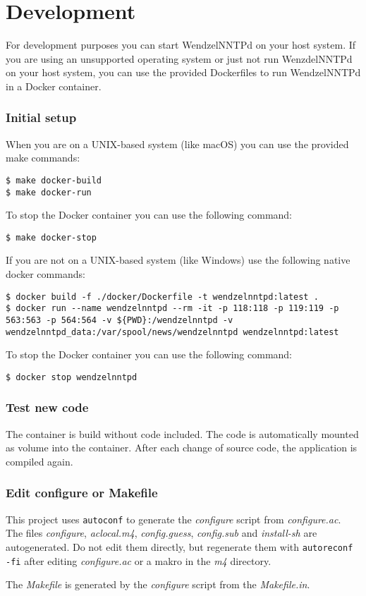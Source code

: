 \chapter{Development}

For development purposes you can start WendzelNNTPd on your host system. If you are using an unsupported operating system or just not run WenzdelNNTPd on your host system, you can use the provided Dockerfiles to run WendzelNNTPd in a Docker container.

\subsection{Initial setup}
When you are on a UNIX-based system (like macOS) you can use the provided make commands:
\begin{verbatim}
$ make docker-build
$ make docker-run
\end{verbatim}
To stop the Docker container you can use the following command:
\begin{verbatim}
$ make docker-stop
\end{verbatim}
If you are not on a UNIX-based system (like Windows) use the following native docker commands:
\begin{verbatim}
$ docker build -f ./docker/Dockerfile -t wendzelnntpd:latest .
$ docker run --name wendzelnntpd --rm -it -p 118:118 -p 119:119 -p 563:563 -p 564:564 -v ${PWD}:/wendzelnntpd -v wendzelnntpd_data:/var/spool/news/wendzelnntpd wendzelnntpd:latest
\end{verbatim}
To stop the Docker container you can use the following command:
\begin{verbatim}
$ docker stop wendzelnntpd
\end{verbatim}

\subsection{Test new code}
The container is build without code included. The code is automatically mounted as volume into the container. After each change of source code, the application is compiled again.

\subsection{Edit configure or Makefile}
This project uses \texttt{autoconf} to generate the \textit{configure} script from \textit{configure.ac}. The files
\textit{configure}, \textit{aclocal.m4}, \textit{config.guess}, \textit{config.sub} and \textit{install-sh} are
autogenerated. Do not edit them directly, but regenerate them with \texttt{autoreconf -fi} after editing
\textit{configure.ac} or a makro in the \textit{m4} directory.

The \textit{Makefile} is generated by the \textit{configure} script from the \textit{Makefile.in}.
